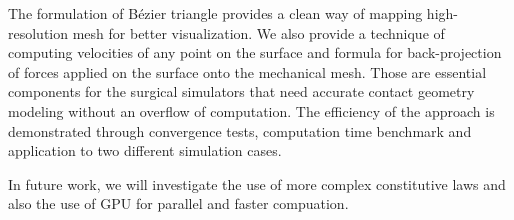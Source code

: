 \documentclass{egpubl}
\begin{document}
The formulation of B\'ezier triangle provides
a clean way of mapping high-resolution mesh for better
visualization. We also provide a technique of computing velocities of any point
on the surface and formula for back-projection of forces applied on the
surface onto the mechanical mesh. 
Those are essential components for the surgical simulators that need accurate contact geometry modeling without an overflow of computation.
The efficiency of the approach is demonstrated through convergence tests,  computation time benchmark and application to two different  simulation cases.

In future work, we will investigate the use of more complex constitutive laws and also the use of GPU for parallel and faster compuation.


\renewcommand{\bibfont}{\footnotesize}

%



\end{document}
